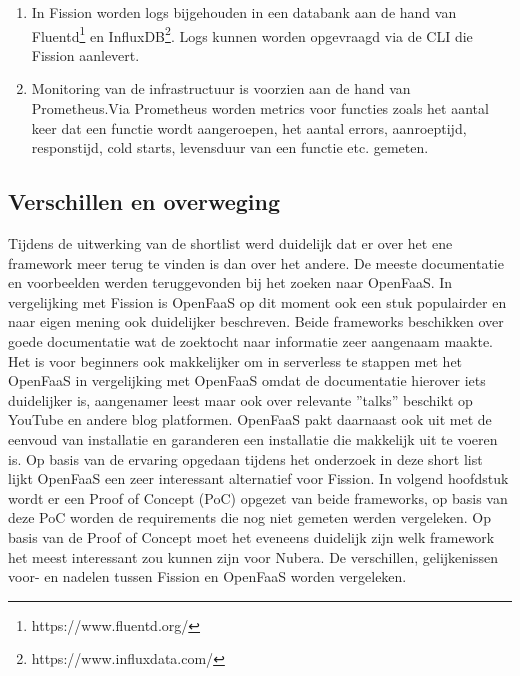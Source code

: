 \begin{enumerate}
    \item In Fission worden logs bijgehouden in een databank aan de hand van Fluentd\footnote{https://www.fluentd.org/} en InfluxDB\footnote{https://www.influxdata.com/}. Logs kunnen worden opgevraagd via de CLI die Fission aanlevert.
    \item Monitoring van de infrastructuur is voorzien aan de hand van Prometheus.Via Prometheus worden metrics voor functies zoals het aantal keer dat een functie wordt aangeroepen, het aantal errors, aanroeptijd, responstijd, cold starts, levensduur van een functie etc. gemeten.
\end{enumerate}

\subsection{Verschillen en overweging}
Tijdens de uitwerking van de shortlist werd duidelijk dat er over het ene framework meer terug te vinden is dan over het andere. De meeste documentatie en voorbeelden werden teruggevonden bij het zoeken naar OpenFaaS. In vergelijking met Fission is OpenFaaS op dit moment ook een stuk populairder en naar eigen mening ook duidelijker beschreven. Beide frameworks beschikken over goede documentatie wat de zoektocht naar informatie zeer aangenaam maakte. Het is voor beginners ook makkelijker om in serverless te stappen met het OpenFaaS in vergelijking met OpenFaaS omdat de documentatie hierover iets duidelijker is, aangenamer leest maar ook over relevante ''talks'' beschikt op YouTube en andere blog platformen. OpenFaaS pakt daarnaast ook uit met de eenvoud van installatie en garanderen een installatie die makkelijk uit te voeren is. Op basis van de ervaring opgedaan tijdens het onderzoek in deze short list lijkt OpenFaaS een zeer interessant alternatief voor Fission. In volgend hoofdstuk wordt er een Proof of Concept (PoC) opgezet van beide frameworks, op basis van deze PoC worden de requirements die nog niet gemeten werden vergeleken. Op basis van de Proof of Concept moet het eveneens duidelijk zijn welk framework het meest interessant zou kunnen zijn voor Nubera. De verschillen, gelijkenissen voor- en nadelen tussen Fission en OpenFaaS worden vergeleken.